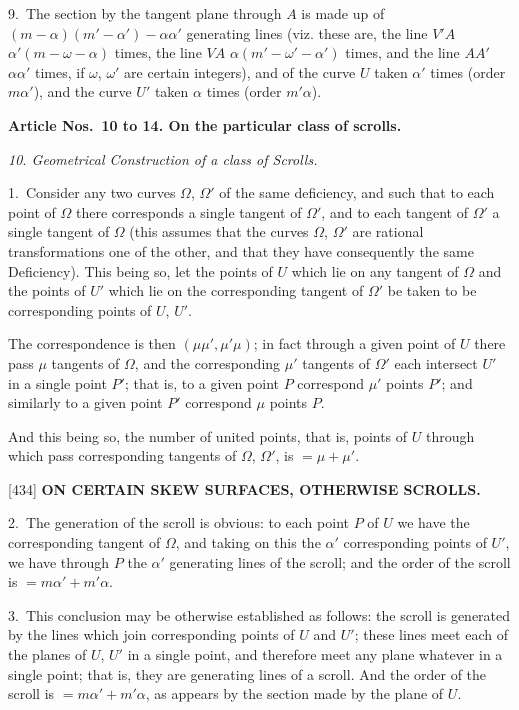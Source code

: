 \documentclass[12pt,a4paper]{article}
\newcommand{\paperref}[1]{\textup{[#1]}}
\theoremstyle{definition}
\begin{document}
9.~The section by the tangent plane through $A$ is made up of $(m - \alpha)(m' - \alpha') - \alpha\alpha'$ generating lines (viz. these are, the line $V'\!A$ $\alpha'(m - \omega - \alpha)$ times, the line $V\!A$ $\alpha(m' - \omega' - \alpha')$ times, and the line $AA'$ $\alpha\alpha'$ times, if $\omega$, $\omega'$ are certain integers), and of the curve $U$ taken $\alpha'$ times (order $m\alpha'$), and the curve $U'$ taken $\alpha$ times (order $m'\alpha$).

\bigskip
\textbf{Article Nos.~10 to 14. On the particular class of scrolls.}

\smallskip
\textit{10. Geometrical Construction of a class of Scrolls.}

1.~Consider any two curves $\Omega$, $\Omega'$ of the same deficiency, and such that to each point of $\Omega$ there corresponds a single tangent of $\Omega'$, and to each tangent of $\Omega'$ a single tangent of $\Omega$ (this assumes that the curves $\Omega$, $\Omega'$ are rational transformations one of the other, and that they have consequently the same Deficiency). This being so, let the points of $U$ which lie on any tangent of $\Omega$ and the points of $U'$ which lie on the corresponding tangent of $\Omega'$ be taken to be corresponding points of $U$, $U'$.

The correspondence is then $(\mu\mu', \mu'\mu)$; in fact through a given point of $U$ there pass $\mu$ tangents of $\Omega$, and the corresponding $\mu'$ tangents of $\Omega'$ each intersect $U'$ in a single point $P'$; that is, to a given point $P$ correspond $\mu'$ points $P'$; and similarly to a given point $P'$ correspond $\mu$ points $P$.

And this being so, the number of united points, that is, points of $U$ through which pass corresponding tangents of $\Omega$, $\Omega'$, is $= \mu + \mu'$.

\newpage
\setcounter{page}{59}

\noindent\paperref{434}\quad
\textbf{ON CERTAIN SKEW SURFACES, OTHERWISE SCROLLS.}

2.~The generation of the scroll is obvious: to each point $P$ of $U$ we have the corresponding tangent of $\Omega$, and taking on this the $\alpha'$ corresponding points of $U'$, we have through $P$ the $\alpha'$ generating lines of the scroll; and the order of the scroll is $= m\alpha' + m'\alpha$.

3.~This conclusion may be otherwise established as follows: the scroll is generated by the lines which join corresponding points of $U$ and $U'$; these lines meet each of the planes of $U$, $U'$ in a single point, and therefore meet any plane whatever in a single point; that is, they are generating lines of a scroll. And the order of the scroll is $= m\alpha' + m'\alpha$, as appears by the section made by the plane of $U$.
\end{document}
